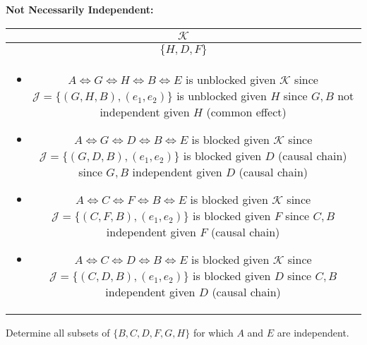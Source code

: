 \begin{example}
    \textbf{Not Necessarily Independent:}
    \begin{center}
        \begin{tabular}{c}
            \toprule
            $\mathcal{K}$ \\
            \midrule
            $\{H,D,F\}$ \\
            \multicolumn{1}{p{\linewidth}}{
                \begin{itemize}
                    \item $A \iff G \iff H \iff B \iff E$ is unblocked given $\mathcal{K}$ since $\mathcal{J} = \{(G,H,B),(e_1,e_2)\}$ is unblocked given $H$ since $G,B$ not independent given $H$ (common effect)
                    \item $A \iff G \iff D \iff B \iff E$ is blocked given $\mathcal{K}$ since $\mathcal{J} = \{(G,D,B),(e_1,e_2)\}$ is blocked given $D$ (causal chain) since $G,B$ independent given $D$ (causal chain)
                    \item $A \iff C \iff F \iff B \iff E$ is blocked given $\mathcal{K}$ since $\mathcal{J} = \{(C,F,B),(e_1,e_2)\}$ is blocked given $F$ since $C,B$ independent given $F$ (causal chain)
                    \item $A \iff C \iff D \iff B \iff E$  is blocked given $\mathcal{K}$ since $\mathcal{J} = \{(C,D,B),(e_1,e_2)\}$ is blocked given $D$ since $C,B$ independent given $D$ (causal chain)
                \end{itemize}} \\
            \midrule
            \toprule
        \end{tabular}
    \end{center}
\end{example}
\newpage

\begin{example}
    Determine all subsets of $\{B,C,D,F,G,H\}$ for which $A$ and $E$ are independent. 

\end{example}
\newpage

